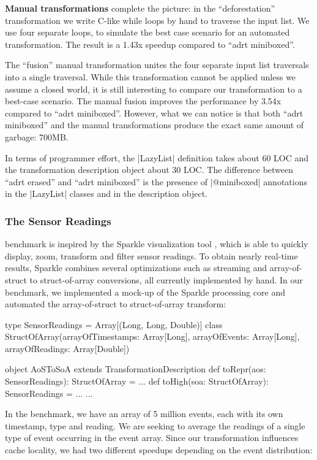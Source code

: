 \noindent
\textbf{Manual transformations} complete the picture: in the ``deforestation'' transformation we write C-like while loops by hand to traverse the input list. We use four separate loops, to simulate the best case scenario for an automated transformation. The result is a 1.43x speedup compared to ``adrt miniboxed''.

The ``fusion'' manual transformation unites the four separate input list traversals into a single traversal. While this transformation cannot be applied unless we assume a closed world, it is still interesting to compare our transformation to a best-case scenario. The manual fusion improves the performance by 3.54x compared to ``adrt miniboxed''. However, what we can notice is that both ``adrt miniboxed'' and the manual transformations produce the exact same amount of garbage: 700MB.

In terms of programmer effort, the |LazyList| definition takes about 60 LOC and the transformation description object about 30 LOC. The difference between ``adrt erased'' and ``adrt miniboxed'' is the presence of |@miniboxed| annotations in the |LazyList| classes and in the description object.

\subsubsection{The Sensor Readings} benchmark is inspired by the Sparkle visualization tool \cite{sparkle}, which is able to quickly display, zoom, transform and filter sensor readings. To obtain nearly real-time results, Sparkle combines several optimizations such as streaming and array-of-struct to struct-of-array conversions, all currently implemented by hand. In our benchmark, we implemented a mock-up of the Sparkle processing core and automated the array-of-struct to struct-of-array transform:

\begin{lstlisting-nobreak}
type SensorReadings = Array[(Long, Long, Double)]
class StructOfArray(arrayOfTimestamps: Array[Long],
                           arrayOfEvents:     Array[Long],
                           arrayOfReadings:   Array[Double])

object AoSToSoA extends TransformationDescription {
  def toRepr(aos: SensorReadings): StructOfArray = ...
  def toHigh(soa: StructOfArray): SensorReadings = ...
  ...
}
\end{lstlisting-nobreak}

In the benchmark, we have an array of 5 million events, each with its own timestamp, type and reading. We are seeking to average the readings of a single type of event occurring in the event array. Since our transformation influences cache locality, we had two different speedups depending on the event distribution:

